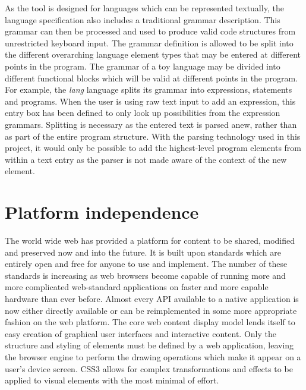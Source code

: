 As the tool is designed for languages which can be represented textually, the language specification also includes a traditional grammar description. This grammar can then be processed and used to produce valid code structures from unrestricted keyboard input. The grammar definition is allowed to be split into the different overarching language element types that may be entered at different points in the program. The grammar of a toy language may be divided into different functional blocks which will be valid at different points in the program. For example, the \textit{lang} language splits its grammar into expressions, statements and programs. When the user is using raw text input to add an expression, this entry box has been defined to only look up possibilities from the expression grammars. Splitting is necessary as the entered text is parsed anew, rather than as part of the entire program structure. With the parsing technology used in this project, it would only be possible to add the highest-level program elements from within a text entry as the parser is not made aware of the context of the new element.

\section{Platform independence}

The world wide web has provided a platform for content to be shared, modified and preserved now and into the future. It is built upon standards which are entirely open and free for anyone to use and implement. The number of these standards is increasing as web browsers become capable of running more and more complicated web-standard applications on faster and more capable hardware than ever before. Almost every API available to a native application is now either directly available or can be reimplemented in some more appropriate fashion on the web platform. The core web content display model lends itself to easy creation of graphical user interfaces and interactive content. Only the structure and styling of elements must be defined by a web application, leaving the browser engine to perform the drawing operations which make it appear on a user's device screen. CSS3 allows for complex transformations and effects to be applied to visual elements with the most minimal of effort.

